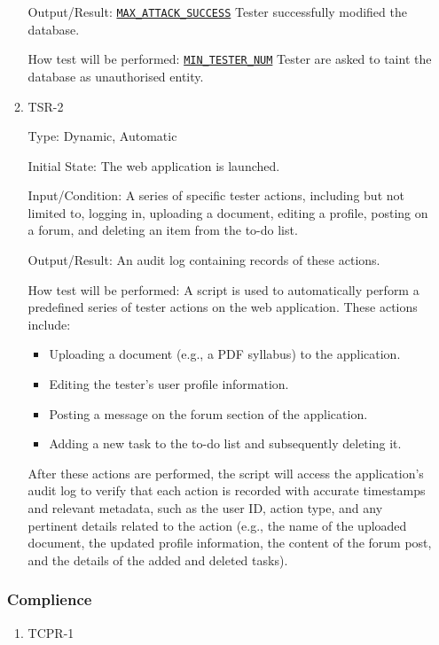 \documentclass[12pt, titlepage]{article}
\begin{document}
\begin{enumerate}
\begin{enumerate}
Output/Result: \hyperref[MAX_ATTACK_SUCCESS]{\texttt{MAX\_ATTACK\_SUCCESS}} Tester successfully modified the database.
					
How test will be performed: \hyperref[MIN_TESTER_NUM]{\texttt{MIN\_TESTER\_NUM}} Tester are asked to taint the database as unauthorised entity.
\item{TSR-2\\}\label{TSR-4}

Type: Dynamic, Automatic
					
Initial State: The web application is launched.
					
Input/Condition: A series of specific tester actions, including but not limited to, logging in, uploading a document, editing a profile, posting on a forum, and deleting an item from the to-do list.
					
Output/Result: An audit log containing records of these actions.
					
How test will be performed: A script is used to automatically perform a predefined series of tester actions on the web application. These actions include:
\begin{itemize}
    \item Uploading a document (e.g., a PDF syllabus) to the application.
    \item Editing the tester's user profile information.
    \item Posting a message on the forum section of the application.
    \item Adding a new task to the to-do list and subsequently deleting it.
\end{itemize}
After these actions are performed, the script will access the application's audit log to verify that each action is recorded with accurate timestamps and relevant metadata, such as the user ID, action type, and any pertinent details related to the action (e.g., the name of the uploaded document, the updated profile information, the content of the forum post, and the details of the added and deleted tasks).


\end{enumerate}

\subsubsection{Complience}

\begin{enumerate}
\item{TCPR-1\\}\label{TCPR-1}


\end{enumerate}
\end{enumerate}
\end{document}
